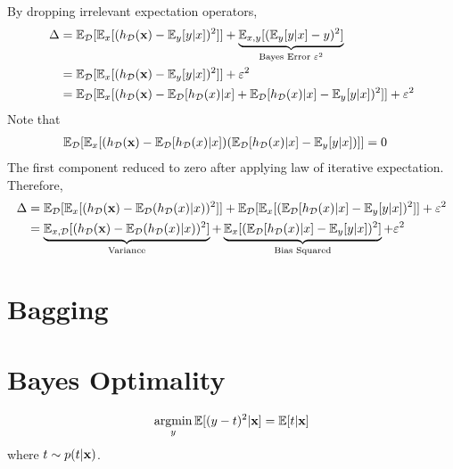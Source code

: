 \documentclass{article}
\begin{document}
	By dropping irrelevant expectation operators, 
	\begin{align}
		\Delta &= \mathbb{E}_{\mathcal{{D}}}[\mathbb{E}_x[(h_{\mathcal{{D}}}(\textbf{x}) - \mathbb{E}_y[y|x])^2]] + \underbrace{\mathbb{E}_{x, y}[(\mathbb{E}_y[y|x] - y)^2]}_{\text{{Bayes Error }} \varepsilon^2} \\
		&= \mathbb{E}_{\mathcal{{D}}}[\mathbb{E}_x[
		(h_{\mathcal{{D}}}(\textbf{x}) - \mathbb{E}_y[y|x])^2
		]] + \varepsilon^2 \\
		&= \mathbb{E}_{\mathcal{{D}}}[\mathbb{E}_x[
		(h_{\mathcal{{D}}}(\textbf{x}) - \mathbb{E}_{\mathcal{{D}}}[h_{\mathcal{{D}}}(x)|x] + \mathbb{E}_{\mathcal{{D}}}[h_{\mathcal{{D}}}(x)|x] -  \mathbb{E}_y[y|x])^2
		]] + \varepsilon^2
	\end{align}
	Note that
	\begin{align}
		\mathbb{E}_{\mathcal{{D}}}[
		\mathbb{E}_x[
		(h_{\mathcal{{D}}}(\textbf{x}) - \mathbb{E}_{\mathcal{{D}}}[h_{\mathcal{{D}}}(x)|x])
		(\mathbb{E}_{\mathcal{{D}}}[h_{\mathcal{{D}}}(x)|x] -  \mathbb{E}_y[y|x])
		]] &= 0
	\end{align}
	The first component reduced to zero after applying law of iterative expectation. \\
	Therefore,
	\begin{align}
		\Delta &= \mathbb{E}_{\mathcal{{D}}}[
		\mathbb{E}_x[
		(h_{\mathcal{{D}}}(\textbf{x}) - \mathbb{E}_{\mathcal{{D}}}(h_{\mathcal{{D}}}(x)|x))^2
		]] + 
		\mathbb{E}_{\mathcal{{D}}}[
		\mathbb{E}_x[
		(\mathbb{E}_{\mathcal{{D}}}[h_{\mathcal{{D}}}(x)|x] -  \mathbb{E}_y[y|x])^2
		]] + \varepsilon^2 \\
		&= \underbrace{\mathbb{E}_{x, \mathcal{{D}}}[
		(h_{\mathcal{{D}}}(\textbf{x}) - \mathbb{E}_{\mathcal{{D}}}(h_{\mathcal{{D}}}(x)|x))^2
		]}_{\text{{Variance}}}
		+ 
		\underbrace{\mathbb{E}_x[
		(\mathbb{E}_{\mathcal{{D}}}[h_{\mathcal{{D}}}(x)|x] -  \mathbb{E}_y[y|x])^2
		]}_{\text{{Bias Squared}}} + \varepsilon^2 \\
	\end{align}
	\section{Bagging}
	\section{Bayes Optimality}
	\begin{theorem}
		\begin{align}
			\operatorname*{argmin}_{y} \mathbb{E}[{(y-t)^2|\textbf{x}}] = \mathbb{E}[{t|\textbf{x}}]
		\end{align}
		where $t \sim p(t|\textbf{x})$.
	\end{theorem}
\end{document}

